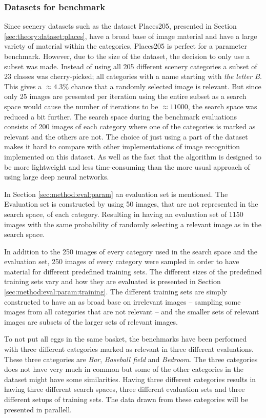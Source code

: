 \subsubsection{Datasets for benchmark}
\label{sec:meth:eval:bench:dataset}

Since scenery datasets such as the dataset Places205, presented in Section \ref{sec:theory:dataset:places}, have a broad base of image material and have a large variety of material within the categories, Places205 is perfect for a parameter benchmark. However, due to the size of the dataset, the decision to only use a subset was made. Instead of using all 205 different scenery categories a subset of 23 classes was cherry-picked; all categories with a name starting with \emph{the letter B}. This gives a $\approx 4.3\%$ chance that a randomly selected image is relevant. But since only 25 images are presented per iteration using the entire subset as a search space would cause the number of iterations to be $\approx 11000$, the search space was reduced a bit further. The search space during the benchmark evaluations consists of 200 images of each category where one of the categories is marked as relevant and the others are not. 
The choice of just using a part of the dataset makes it hard to compare with other implementations of image recognition implemented on this dataset. As well as the fact that the algorithm is designed to be more lightweight and less time-consuming than the more usual approach of using large deep neural networks.

In Section \ref{sec:method:eval:param} an evaluation set is mentioned. The Evaluation set is constructed by using 50 images, that are not represented in the search space, of each category. Resulting in having an evaluation set of 1150 images with the same probability of randomly selecting a relevant image as in the search space.  

In addition to the 250 images of every category used in the search space and the evaluation set, 250 images of every category were sampled in order to have material for different predefined training sets. The different sizes of the predefined training sets vary and how they are evaluated is presented in Section \ref{sec:method:eval:param:training}. The different training sets are simply constructed to have an as broad base on irrelevant images -- sampling some images from all categories that are not relevant -- and the smaller sets of relevant images are subsets of the larger sets of relevant images.  

To not put all eggs in the same basket, the benchmarks have been performed with three different categories marked as relevant in three different evaluations. These three categories are \emph{Bar}, \emph{Baseball field} and \emph{Bedroom}. The three categories does not have very much in common but some of the other categories in the dataset might have some similarities. Having three different categories results in having three different search spaces, three different evaluation sets and three different setups of training sets. The data drawn from these categories will be presented in parallell. 

